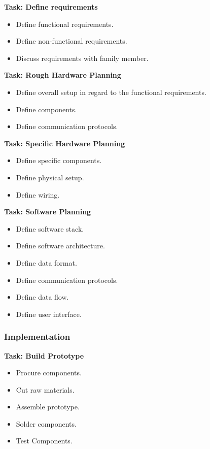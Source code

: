 \textbf{Task: Define requirements}
\begin{itemize}
    \item Define functional requirements.
    \item Define non-functional requirements.
    \item Discuss requirements with family member.
\end{itemize}

\textbf{Task: Rough Hardware Planning}
\begin{itemize}
    \item Define overall setup in regard to the functional requirements.
    \item Define components.
    \item Define communication protocols.
\end{itemize}

\textbf{Task: Specific Hardware Planning}
\begin{itemize}
    \item Define specific components.
    \item Define physical setup.
    \item Define wiring.
\end{itemize}

\newpage
\textbf{Task: Software Planning}
\begin{itemize}
    \item Define software stack.
    \item Define software architecture.
    \item Define data format.
    \item Define communication protocols.
    \item Define data flow.
    \item Define user interface.
\end{itemize}

\subsubsection{Implementation}
\textbf{Task: Build Prototype}
\begin{itemize}
    \item Procure components.
    \item Cut raw materials.
    \item Assemble prototype.
    \item Solder components.
    \item Test Components.
\end{itemize}

